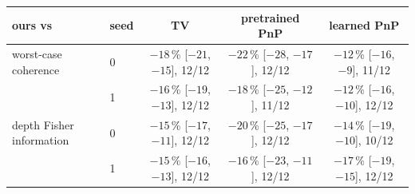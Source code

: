\begin{tabular}{@{}ll ccc@{}}\toprule
ours vs & seed & TV & pretrained PnP & learned PnP\\\midrule
worst-case coherence & 0 & $-18$\,\% [$-21$, $-15$], 12/12 & $-22$\,\% [$-28$, $-17$], 12/12 & $-12$\,\% [$-16$, $-9$], 11/12\\
 & 1 & $-16$\,\% [$-19$, $-13$], 12/12 & $-18$\,\% [$-25$, $-12$], 11/12 & $-12$\,\% [$-16$, $-10$], 12/12\\
depth Fisher information & 0 & $-15$\,\% [$-17$, $-11$], 12/12 & $-20$\,\% [$-25$, $-17$], 12/12 & $-14$\,\% [$-19$, $-10$], 10/12\\
 & 1 & $-15$\,\% [$-16$, $-13$], 12/12 & $-16$\,\% [$-23$, $-11$], 12/12 & $-17$\,\% [$-19$, $-15$], 12/12\\
\bottomrule\end{tabular}
